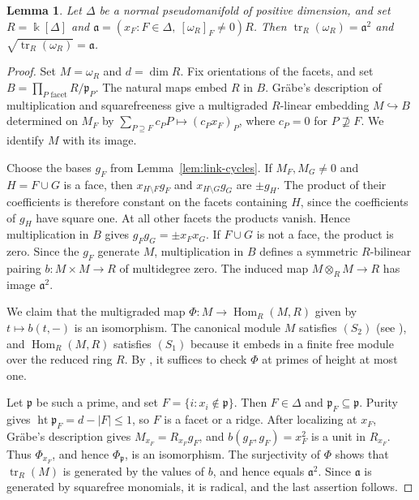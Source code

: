 \documentclass[a4paper,11pt]{amsart}
\theoremstyle{plain}
\newtheorem{lemma}[theorem]{Lemma}
\theoremstyle{definition}
\theoremstyle{remark}
\DeclareMathOperator{\tr}{tr}
\DeclareMathOperator{\Hom}{Hom}
\newcommand{\kk}{\Bbbk}
\begin{document}
\begin{lemma}\label{lem:canonical-pairing}
Let $\Delta$ be a normal pseudomanifold of positive dimension, and set $R=\kk[\Delta]$ and $\mathfrak a=(x_F:F\in\Delta,\ [\omega_R]_F\ne0)R$. Then $\tr_R(\omega_R)=\mathfrak a^2$ and $\sqrt{\tr_R(\omega_R)}=\mathfrak a$.
\end{lemma}
\begin{proof}
Set $M=\omega_R$ and $d=\dim R$. Fix orientations of the facets, and set $B=\prod_{P\text{ facet}}R/\mathfrak p_P$. The natural maps embed $R$ in $B$. Gr\"abe's description of multiplication and squarefreeness give a multigraded $R$-linear embedding $M\hookrightarrow B$ determined on $M_F$ by $\sum_{P\supseteq F}c_PP\mapsto(c_Px_F)_P$, where $c_P=0$ for $P\not\supseteq F$. We identify $M$ with its image.

Choose the bases $g_F$ from Lemma~\ref{lem:link-cycles}. If $M_F,M_G\ne0$ and $H=F\cup G$ is a face, then $x_{H\setminus F}g_F$ and $x_{H\setminus G}g_G$ are $\pm g_H$. The product of their coefficients is therefore constant on the facets containing $H$, since the coefficients of $g_H$ have square one. At all other facets the products vanish. Hence multiplication in $B$ gives $g_Fg_G=\pm x_Fx_G$. If $F\cup G$ is not a face, the product is zero. Since the $g_F$ generate $M$, multiplication in $B$ defines a symmetric $R$-bilinear pairing $b:M\times M\to R$ of multidegree zero. The induced map $M\otimes_R M\to R$ has image $\mathfrak a^2$.

We claim that the multigraded map $\Phi:M\to\Hom_R(M,R)$ given by $t\mapsto b(t,-)$ is an isomorphism. The canonical module $M$ satisfies $(S_2)$ (see \cite[Lemma~1.9\,(e)]{Sch98}), and $\Hom_R(M,R)$ satisfies $(S_1)$ because it embeds in a finite free module over the reduced ring $R$. By \cite[Lemma~2.20]{DFI15}, it suffices to check $\Phi$ at primes of height at most one.

Let $\mathfrak p$ be such a prime, and set $F=\{i:x_i\notin\mathfrak p\}$. Then $F\in\Delta$ and $\mathfrak p_F\subseteq\mathfrak p$. Purity gives $\operatorname{ht}\mathfrak p_F=d-|F|\leq1$, so $F$ is a facet or a ridge. After localizing at $x_F$, Gr\"abe's description gives $M_{x_F}=R_{x_F}g_F$, and $b(g_F,g_F)=x_F^2$ is a unit in $R_{x_F}$. Thus $\Phi_{x_F}$, and hence $\Phi_{\mathfrak p}$, is an isomorphism. The surjectivity of $\Phi$ shows that $\tr_R(M)$ is generated by the values of $b$, and hence equals $\mathfrak a^2$. Since $\mathfrak a$ is generated by squarefree monomials, it is radical, and the last assertion follows.
\end{proof}
\end{document}
